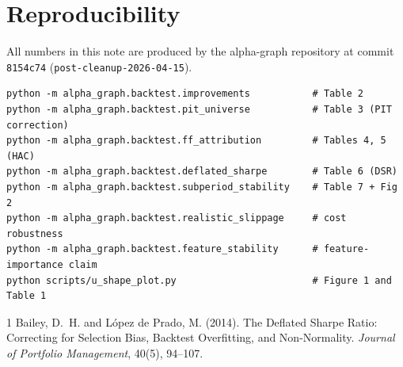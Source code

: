 \documentclass[11pt]{article}
\begin{document}
\section{Reproducibility}

All numbers in this note are produced by the alpha-graph repository at
commit \texttt{8154c74} (\texttt{post-cleanup-2026-04-15}).

\begin{verbatim}
python -m alpha_graph.backtest.improvements           # Table 2
python -m alpha_graph.backtest.pit_universe           # Table 3 (PIT correction)
python -m alpha_graph.backtest.ff_attribution         # Tables 4, 5 (HAC)
python -m alpha_graph.backtest.deflated_sharpe        # Table 6 (DSR)
python -m alpha_graph.backtest.subperiod_stability    # Table 7 + Fig 2
python -m alpha_graph.backtest.realistic_slippage     # cost robustness
python -m alpha_graph.backtest.feature_stability      # feature-importance claim
python scripts/u_shape_plot.py                        # Figure 1 and Table 1
\end{verbatim}


\begin{thebibliography}{1}
 Bailey, D.~H. and L\'opez de Prado, M. (2014).
  The Deflated Sharpe Ratio: Correcting for Selection Bias, Backtest
  Overfitting, and Non-Normality.
  \emph{Journal of Portfolio Management}, 40(5), 94--107.
\end{thebibliography}
\end{document}
